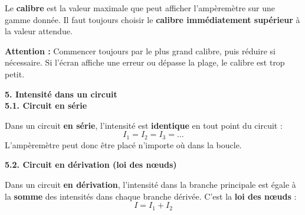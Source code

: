 \documentclass[11pt,a4paper]{article}
\begin{document}
\begin{tcolorbox}[colback=red!5!white,colframe=red!75!black]
{
Le \textbf{calibre} est la valeur maximale que peut afficher l'ampèremètre sur une gamme donnée. Il faut toujours choisir le \textbf{calibre immédiatement supérieur} à la valeur attendue.
}
\end{tcolorbox}

\textbf{Attention : } Commencer toujours par le plus grand calibre, puis réduire si nécessaire. Si l'écran affiche une erreur ou dépasse la plage, le calibre est trop petit. \\

\vspace{3mm}

\textbf{5. Intensité dans un circuit} \\

\textbf{5.1. Circuit en série}

\begin{tcolorbox}[colback=red!5!white,colframe=red!75!black]
{
Dans un circuit \textbf{en série}, l'intensité est \textbf{identique} en tout point du circuit :
$$I_1 = I_2 = I_3 = \ldots$$
L'ampèremètre peut donc être placé n'importe où dans la boucle.
}
\end{tcolorbox}

\textbf{5.2. Circuit en dérivation (loi des nœuds)}

\begin{tcolorbox}[colback=red!5!white,colframe=red!75!black]
{
Dans un circuit \textbf{en dérivation}, l'intensité dans la branche principale est égale à la \textbf{somme} des intensités dans chaque branche dérivée. C'est la \textbf{loi des nœuds} :
$$I = I_1 + I_2$$
\begin{center}
\end{center}
}
\end{tcolorbox}
\end{document}

